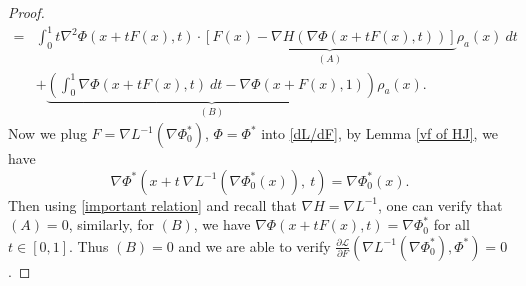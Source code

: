 \documentclass{article}
\begin{document}
\begin{proof}
\begin{align}
     =& \int_0^1  t\nabla^2\Phi(x+t {F}(x), t)\cdot \underbrace{ [ {F}(x) - \nabla H( \nabla\Phi(x+t {F}(x), t)) ] }_{(A)} \rho_a(x)~dt  \label{dL/dF} \\
     & + \underbrace{ \left( \int_0^1\nabla\Phi(x+t {F}(x), t)~dt -  \nabla\Phi(x+ {F}(x), 1) \right) }_{(B)} \rho_a(x). \nonumber
  \end{align}
  Now we plug $ {F} = \nabla L^{-1} (\nabla\Phi^*_0)$, $\Phi = \Phi^*$ into \eqref{dL/dF}, by Lemma \ref{vf of HJ}, we have 
  \begin{equation}
     \nabla\Phi^*(x+t~\nabla L^{-1}(\nabla\Phi^*_0(x)), ~t) = \nabla\Phi^*_0(x). \label{important relation}
  \end{equation}
  Then using \eqref{important relation} and recall that $\nabla H = \nabla L^{-1}$, one can verify that $(A)=0$, similarly, for $(B)$, we have $\nabla\Phi(x+t {F}(x) ,t) = \nabla\Phi^*_0$ for all $t\in [0,1]$. Thus $(B)=0$ and we are able to verify $\frac{\partial \mathcal{L}}{\partial{F}}(\nabla L^{-1}(\nabla \Phi^*_0), \Phi^*) = 0$. 
  

\end{proof}
\end{document}

